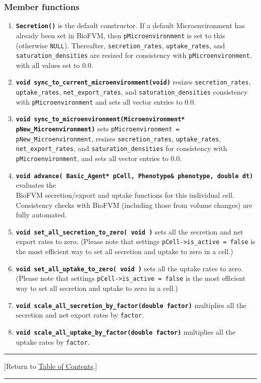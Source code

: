 \documentclass[12pt]{article}
\renewcommand{\v}{\verb}
\newcommand{\smallcode}[1]{\textbf{\texttt{#1}}}
\newcommand{\TOClink}{\begin{center}\hrule\vskip-5pt\phantom{.}\hfill[Return to \hyperlink{TOC}{Table of Contents}.]\hfill\phantom{.}\vskip3pt\hrule\end{center}}
\begin{document}
\subsubsection{Member functions}
\begin{enumerate}
\item 
\smallcode{Secretion()} is the default constructor. If a default Microenvironment has already 
been set in BioFVM, then \v|pMicroenvironment| is set to this (otherwise \v|NULL|). 
Thereafter, \v|secretion_rates|, \v|uptake_rates|, and \v|saturation_densities| are resized for consistency with \v|pMicroenvironment|, with all values 
set to 0.0.

\item
\smallcode{void sync\_to\_current\_microenvironment(void)} resizes 
\v|secretion_rates|, \v|uptake_rates|, \v|net_export_rates|, and \v|saturation_densities| 
consistency with \v|pMicroenvironment| and sets all vector entries to 0.0. 

\item
\smallcode{void sync\_to\_microenvironment(Microenvironment* pNew\_Microenvironment)}
sets \hfill\break \v|pMicroenvironment = pNew_Microenvironment|, resizes 
\v|secretion_rates|, \v|uptake_rates|, \v|net_export_rates|, and \hfill\break \v|saturation_densities| 
for consistency with \v|pMicroenvironment|, and sets all vector entries to 0.0. 

\item 
\smallcode{void advance( Basic\_Agent* pCell, Phenotype\& phenotype, 
double dt)} evaluates the \\ BioFVM secretion/export and uptake functions 
for this individual cell. Consistency checks with BioFVM (including 
those from volume changes) are fully automated. 

\item 
\smallcode{void set\_all\_secretion\_to\_zero( void )} sets all the 
secretion and net export rates to zero. (Please note that settings 
\v|pCell->is_active = false| is the most efficient way to set 
all secretion and uptake to zero in a cell.) 

\item 
\smallcode{void set\_all\_uptake\_to\_zero( void )} sets all the 
uptake rates to zero. (Please note that settings 
\v|pCell->is_active = false| is the most efficient way to set 
all secretion and uptake to zero in a cell.) 

\item 
\smallcode{void scale\_all\_secretion\_by\_factor(double factor)} multiplies 
all the secretion and net export rates by \v|factor|. 

\item 
\smallcode{void scale\_all\_uptake\_by\_factor(double factor)} multiplies 
all the uptake rates by \v|factor|. 

\end{enumerate}
\TOClink
\end{document}
